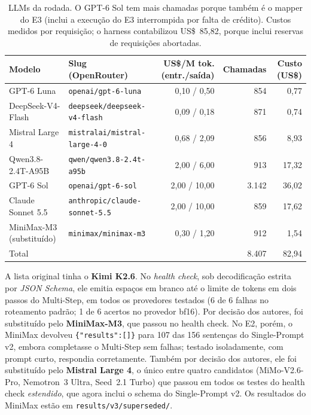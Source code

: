 \documentclass[11pt,a4paper]{article}
\begin{document}
\begin{table}[H]
\centering\footnotesize\setlength{\tabcolsep}{4.5pt}
\begin{tabular}{llrrr}
\toprule
Modelo & Slug (OpenRouter) & US\$/M tok. (entr./saída) & Chamadas & Custo (US\$)\\
\midrule
GPT-6 Luna & \texttt{openai/gpt-6-luna} & 0,10 / 0,50 & 854 & 0,77\\
DeepSeek-V4-Flash & \texttt{deepseek/deepseek-v4-flash} & 0,09 / 0,18 & 871 & 0,74\\
Mistral Large 4 & \texttt{mistralai/mistral-large-4-0} & 0,68 / 2,09 & 856 & 8,93\\
Qwen3.8-2.4T-A95B & \texttt{qwen/qwen3.8-2.4t-a95b} & 2,00 / 6,00 & 913 & 17,32\\
GPT-6 Sol & \texttt{openai/gpt-6-sol} & 2,00 / 10,00 & 3.142 & 36,02\\
Claude Sonnet 5.5 & \texttt{anthropic/claude-sonnet-5.5} & 2,00 / 10,00 & 859 & 17,62\\
\midrule
MiniMax-M3 (substituído) & \texttt{minimax/minimax-m3} & 0,30 / 1,20 & 912 & 1,54\\
\midrule
\multicolumn{3}{l}{Total} & 8.407 & 82,94\\
\bottomrule
\end{tabular}
\caption{LLMs da rodada. O GPT-6 Sol tem mais chamadas porque também é o mapper do E3 (inclui a execução do E3
interrompida por falta de crédito). Custos medidos por requisição; o harness contabilizou US\$~85,82, porque
inclui reservas de requisições abortadas.}
\end{table}

A lista original tinha o \textbf{Kimi K2.6}. No \emph{health check}, sob decodificação estrita por
\emph{JSON Schema}, ele emitia espaços em branco até o limite de tokens em dois passos do Multi-Step, em todos os
provedores testados (6 de 6 falhas no roteamento padrão; 1 de 6 acertos no provedor bf16). Por decisão dos
autores, foi substituído pelo \textbf{MiniMax-M3}, que passou no health check. No E2, porém, o MiniMax devolveu
\texttt{\{"results":[]\}} para 107 das 156 sentenças do Single-Prompt v2, embora completasse o Multi-Step sem
falhas; testado isoladamente, com prompt curto, respondia corretamente. Também por decisão dos autores, ele foi
substituído pelo \textbf{Mistral Large 4}, o único entre quatro candidatos (MiMo-V2.6-Pro, Nemotron~3 Ultra,
Seed~2.1 Turbo) que passou em todos os testes do health check \emph{estendido}, que agora inclui o schema do
Single-Prompt v2. Os resultados do MiniMax estão em \texttt{results/v3/superseded/}.
\end{document}
